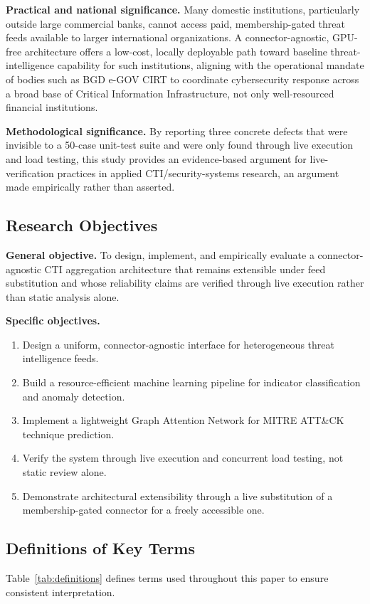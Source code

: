 \documentclass[conference]{IEEEtran}
\begin{document}
\textbf{Practical and national significance.} Many domestic institutions, particularly outside large commercial banks, cannot access paid, membership-gated threat feeds available to larger international organizations. A connector-agnostic, GPU-free architecture offers a low-cost, locally deployable path toward baseline threat-intelligence capability for such institutions, aligning with the operational mandate of bodies such as BGD e-GOV CIRT \cite{bgdcirt} to coordinate cybersecurity response across a broad base of Critical Information Infrastructure, not only well-resourced financial institutions.

\textbf{Methodological significance.} By reporting three concrete defects that were invisible to a 50-case unit-test suite and were only found through live execution and load testing, this study provides an evidence-based argument for live-verification practices in applied CTI/security-systems research, an argument made empirically rather than asserted.

\subsection{Research Objectives}
\label{sec:objectives}
\textbf{General objective.} To design, implement, and empirically evaluate a connector-agnostic CTI aggregation architecture that remains extensible under feed substitution and whose reliability claims are verified through live execution rather than static analysis alone.

\textbf{Specific objectives.}
\begin{enumerate}
\item[O1.] Design a uniform, connector-agnostic interface for heterogeneous threat intelligence feeds.
\item[O2.] Build a resource-efficient machine learning pipeline for indicator classification and anomaly detection.
\item[O3.] Implement a lightweight Graph Attention Network for MITRE ATT\&CK technique prediction.
\item[O4.] Verify the system through live execution and concurrent load testing, not static review alone.
\item[O5.] Demonstrate architectural extensibility through a live substitution of a membership-gated connector for a freely accessible one.
\end{enumerate}

\subsection{Definitions of Key Terms}
\label{sec:definitions}
Table~\ref{tab:definitions} defines terms used throughout this paper to ensure consistent interpretation.
\end{document}
